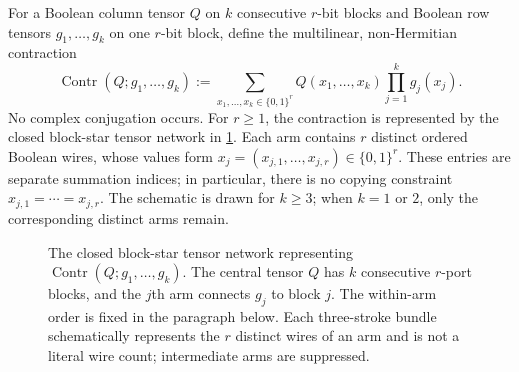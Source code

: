 \documentclass[11pt]{article}
\theoremstyle{definition}
\theoremstyle{remark}
\newcommand{\bits}{\{0,1\}}
\newcommand{\Contr}{\operatorname{Contr}}
\begin{document}
For a Boolean column tensor $Q$ on $k$ consecutive $r$-bit blocks and
Boolean row tensors $g_1,\ldots,g_k$ on one $r$-bit block, define the
multilinear, non-Hermitian contraction
\begin{equation}
  \Contr(Q;g_1,\ldots,g_k)
  :=
  \sum_{x_1,\ldots,x_k\in\bits^r}
    Q(x_1,\ldots,x_k)\prod_{j=1}^k g_j(x_j).
  \label{eq:multilinear-contraction}
\end{equation}
No complex conjugation occurs.  For $r\ge1$, the contraction is represented
by the closed block-star tensor network in
\cref{fig:block-star-contraction}.  Each arm contains $r$ distinct ordered
Boolean wires, whose values form
$x_j=(x_{j,1},\ldots,x_{j,r})\in\bits^r$.  These entries are separate
summation indices; in particular, there is no copying constraint
$x_{j,1}=\cdots=x_{j,r}$.  The schematic is drawn for $k\ge3$; when
$k=1$ or $2$, only the corresponding distinct arms remain.

\begin{figure}[htbp]
  \centering
  \caption{The closed block-star tensor network representing
    $\Contr(Q;g_1,\ldots,g_k)$.  The central tensor $Q$ has $k$ consecutive
    $r$-port blocks, and the $j$th arm connects $g_j$ to block $j$.
    The within-arm order is fixed in the paragraph below.  Each
    three-stroke bundle schematically represents
    the $r$ distinct wires of an arm and is not a literal wire count;
    intermediate arms are suppressed.}
  \label{fig:block-star-contraction}
\end{figure}
\end{document}
